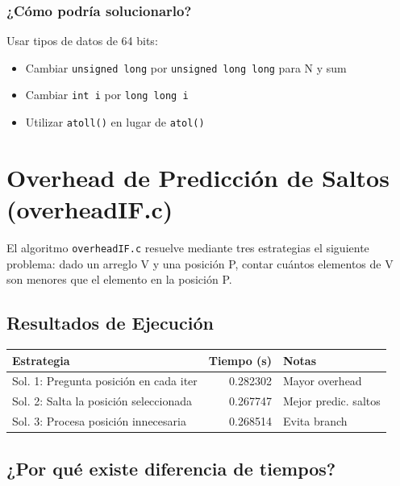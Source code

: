 \documentclass[11pt,a4paper]{article}
\begin{document}
\subsubsection*{¿Cómo podría solucionarlo?}

Usar tipos de datos de 64 bits:
\begin{itemize}
\item Cambiar \texttt{unsigned long} por \texttt{unsigned long long} para N y sum
\item Cambiar \texttt{int i} por \texttt{long long i}
\item Utilizar \texttt{atoll()} en lugar de \texttt{atol()}
\end{itemize}

\section{Overhead de Predicción de Saltos (overheadIF.c)}

El algoritmo \texttt{overheadIF.c} resuelve mediante tres estrategias el siguiente problema: dado un arreglo V y una posición P, contar cuántos elementos de V son menores que el elemento en la posición P.

\subsection*{Resultados de Ejecución}

\begin{center}
\begin{tabular}{|l|r|l|}
\hline
\textbf{Estrategia} & \textbf{Tiempo (s)} & \textbf{Notas} \\
\hline
Sol. 1: Pregunta posición en cada iter & 0.282302 & Mayor overhead \\
Sol. 2: Salta la posición seleccionada & 0.267747 & Mejor predic. saltos \\
Sol. 3: Procesa posición innecesaria & 0.268514 & Evita branch \\
\hline
\end{tabular}
\end{center}

\subsection*{¿Por qué existe diferencia de tiempos?}
\end{document}
